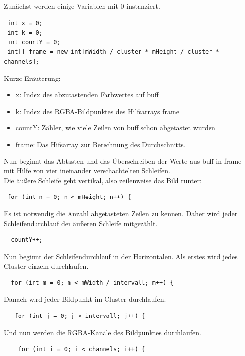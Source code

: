 \begin{description}
Zunächst werden einige Variablen mit \textcolor{blau}{0} instanziert.
\begin{lstlisting}
 int x = 0;
 int k = 0;                                                                                  
 int countY = 0;                                                                             
 int[] frame = new int[mWidth / cluster * mHeight / cluster * channels];                            
\end{lstlisting}
Kurze Eräuterung:
\begin{itemize}
\item x: Index des abzutastenden Farbwertes auf buff
\item k: Index des RGBA-Bildpunktes des Hilfsarrays frame
\item countY: Zähler, wie viele Zeilen von buff schon abgetastet wurden
\item frame: Das Hifsarray zur Berechnung des Durchschnitts.   
\end{itemize}
Nun beginnt das Abtasten und das Überschreiben der Werte aus buff in frame mit Hilfe von vier ineinander verschachtelten Schleifen.\\
Die äußere Schleife geht vertikal, also zeilenweise das Bild runter:
\begin{lstlisting}
 for (int n = 0; n < mHeight; n++) {                                                         
\end{lstlisting}
Es ist notwendig die Anzahl abgetasteten Zeilen zu kennen. Daher wird jeder Schleifendurchlauf der äußeren Schleife mitgezählt.
\begin{lstlisting}
  countY++;                                                                               
\end{lstlisting}
Nun beginnt der Schleifendurchlauf in der Horizontalen. Als erstes wird jedes Cluster einzeln durchlaufen.
\begin{lstlisting}
  for (int m = 0; m < mWidth / intervall; m++) {                                            
\end{lstlisting}
Danach wird jeder Bildpunkt im Cluster durchlaufen.
\begin{lstlisting}            
   for (int j = 0; j < intervall; j++) {                                                 
\end{lstlisting}
Und nun werden die RGBA-Kanäle des Bildpunktes durchlaufen. 
\begin{lstlisting}
    for (int i = 0; i < channels; i++) {                                                   

\end{lstlisting}
\end{description}
